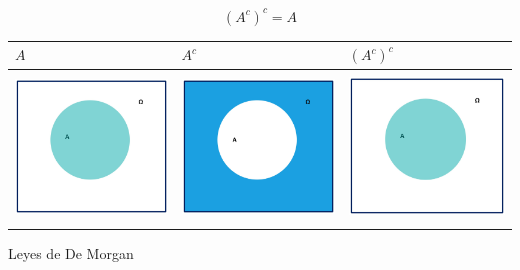 \documentclass[
  letterpaper,
  DIV=11,
  numbers=noendperiod]{scrreprt}
\begin{document}
\[(A^c)^c=A\]

\begin{longtable}[]{@{}
  >{\centering\arraybackslash}p{}
  >{\centering\arraybackslash}p{}
  >{\centering\arraybackslash}p{}@{}}
\toprule\noalign{}
\begin{minipage}[b]{\linewidth}\centering
\(A\)
\end{minipage} & \begin{minipage}[b]{\linewidth}\centering
\(A^c\)
\end{minipage} & \begin{minipage}[b]{\linewidth}\centering
\((A^c)^c\)
\end{minipage} \\
\midrule\noalign{}
\endhead
\bottomrule\noalign{}
\endlastfoot
\includegraphics[width=\linewidth,height=1.5625in,keepaspectratio]{Images/venn1A_solo.jpeg}
&
\includegraphics[width=\linewidth,height=1.5625in,keepaspectratio]{Images/venn1solo_Ac.jpeg}
&
\includegraphics[width=\linewidth,height=1.5625in,keepaspectratio]{Images/venn1A_solo.jpeg} \\
\end{longtable}

Leyes de De Morgan
\end{document}
